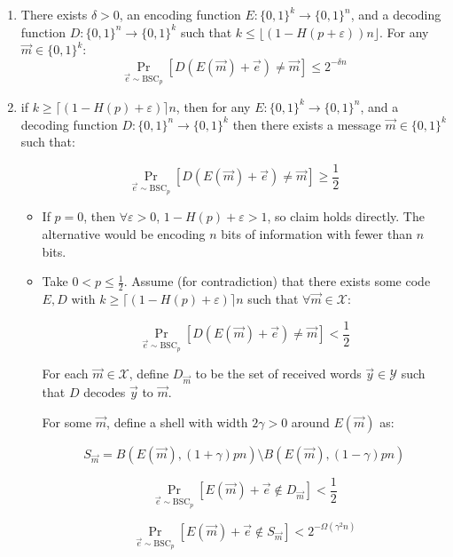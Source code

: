 \documentclass{idc_msc}
\begin{document}
\begin{enumerate}
  \item There exists \(\delta > 0\),
  an encoding function \(E : \{0,1\}^k \to \{0,1\}^n\),
  and a decoding function \(D : \{0,1\}^n \to \{0,1\}^k\) such that \(k \le \lfloor(1-H(p+\varepsilon))n\rfloor\).
  For any \(\vec{m} \in \{0,1\}^k\):
  \[\Pr_{\vec{e} \sim \text{BSC}_p}[D(E(\vec{m}) + \vec{e}) \ne \vec{m}] \le 2^{-\delta n}\]

  \item if \(k \ge \lceil (1 - H(p) + \varepsilon) \rceil n\),
  then for any \(E : \{0,1\}^k \to \{0,1\}^n\),
  and a decoding function \(D : \{0,1\}^n \to \{0,1\}^k\) then there exists a message \(\vec{m} \in \{0,1\}^k\) such that:

  \[\Pr_{\vec{e} \sim \text{BSC}_p}[D(E(\vec{m}) + \vec{e}) \ne \vec{m}] \ge \frac{1}{2}\]

  \begin{itemize}
    \item If \(p = 0\), then \(\forall \varepsilon > 0\), \(1 - H(p) + \varepsilon > 1\), so claim holds directly.
    The alternative would be encoding \(n\) bits of information with fewer than \(n\) bits.

    \item Take \(0 < p \le \frac{1}{2}\).
    Assume (for contradiction) that there exists some code \(E,D\) with \(k \ge \lceil (1 - H(p) + \varepsilon) \rceil n\) such that \(\forall \vec{m} \in \mathcal{X}\):

    \[\Pr_{\vec{e} \sim \text{BSC}_p} [D(E(\vec{m}) + \vec{e}) \ne \vec{m}] < \frac{1}{2}\]

    For each \(\vec{m} \in \mathcal{X}\), define \(D_{\vec{m}}\) to be the set of received words \(\vec{y} \in \mathcal{Y}\) such that \(D\) decodes \(\vec{y}\) to \(\vec{m}\).

    For some \(\vec{m}\), define a shell with width \(2\gamma > 0\) around \(E(\vec{m})\) as:

    \[S_{\vec{m}}=B(E(\vec{m}), (1 + \gamma) pn) \setminus B(E(\vec{m}), (1-\gamma)pn)\]

    \[\Pr_{\vec{e} \sim \text{BSC}_p} [E(\vec{m}) + \vec{e} \notin D_{\vec{m}}] < \frac{1}{2}\]

    \[\Pr_{\vec{e} \sim \text{BSC}_p} [E(\vec{m}) + \vec{e} \notin S_{\vec{m}}] < 2^{-\Omega(\gamma^2n)} \]


\end{itemize}
\end{enumerate}
\end{document}
